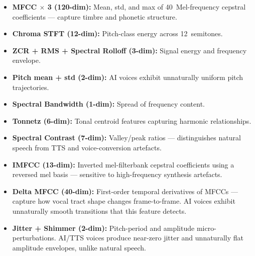 \documentclass[10pt,twocolumn]{article}
\begin{document}
\begin{itemize}[leftmargin=*,itemsep=1pt]
  \item \textbf{MFCC $\times$ 3 (120-dim):} Mean, std, and max of
        40~Mel-frequency cepstral coefficients — capture timbre and phonetic
        structure.
  \item \textbf{Chroma STFT (12-dim):} Pitch-class energy across 12~semitones.
  \item \textbf{ZCR + RMS + Spectral Rolloff (3-dim):} Signal energy and frequency
        envelope.
  \item \textbf{Pitch mean + std (2-dim):} AI voices exhibit unnaturally uniform
        pitch trajectories.
  \item \textbf{Spectral Bandwidth (1-dim):} Spread of frequency content.
  \item \textbf{Tonnetz (6-dim):} Tonal centroid features capturing harmonic
        relationships.
  \item \textbf{Spectral Contrast (7-dim):} Valley/peak ratios — distinguishes
        natural speech from TTS and voice-conversion artefacts.
  \item \textbf{IMFCC (13-dim):} Inverted mel-filterbank cepstral coefficients
        using a reversed mel basis — sensitive to high-frequency synthesis
        artefacts.
  \item \textbf{Delta MFCC (40-dim):} First-order temporal derivatives of MFCCs —
        capture how vocal tract shape changes frame-to-frame. AI voices exhibit
        unnaturally smooth transitions that this feature detects.
  \item \textbf{Jitter + Shimmer (2-dim):} Pitch-period and amplitude
        micro-perturbations. AI/TTS voices produce near-zero jitter and unnaturally
        flat amplitude envelopes, unlike natural speech.
\end{itemize}
\end{document}
